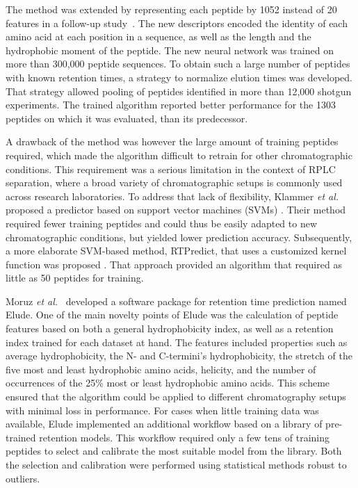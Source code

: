 \documentclass[a4paper]{article}
\begin{document}
The method was extended by representing each peptide by 1052 instead
of 20 features in a follow-up study~\cite{petritis2006improved}. The
new descriptors encoded the identity of each amino acid at each
position in a sequence, as well as the length and the hydrophobic
moment of the peptide. The new neural network was trained on more than
300,000 peptide sequences. To obtain such a large number of peptides
with known retention times, a strategy to normalize elution times was
developed. That strategy allowed pooling of peptides identified in
more than 12,000 shotgun experiments. The trained algorithm reported
better performance for the 1303 peptides on which it was evaluated,
than its predecessor.


A drawback of the method was however the large amount of training
peptides required, which made the algorithm difficult to retrain for
other chromatographic conditions. This requirement was a serious
limitation in the context of RPLC separation, where a broad variety of
chromatographic setups is commonly used across research
laboratories. To address that lack of flexibility, Klammer {\em et
  al.} proposed a predictor based on support vector machines (SVMs)
\cite{klammer2007improving}. Their method required fewer training
peptides and could thus be easily adapted to new chromatographic
conditions, but yielded lower prediction accuracy.  Subsequently, a
more elaborate SVM-based method, {\sc RTPredict}, that uses a
customized kernel function was proposed \cite{rtpredict,
  rtpredictImproved}. That approach provided an algorithm that
required as little as 50 peptides for training.


Moruz {\em et al.}~\cite{elude1} developed a software package for
retention time prediction named {\sc Elude}. One of the main novelty
points of {\sc Elude} was the calculation of peptide features based on
both a general hydrophobicity index, as well as a retention index
trained for each dataset at hand. The features included properties
such as average hydrophobicity, the N- and C-termini's hydrophobicity,
the stretch of the five most and least hydrophobic amino acids,
helicity, and the number of occurrences of the 25\% most or least
hydrophobic amino acids. This scheme ensured that the algorithm could
be applied to different chromatography setups with minimal loss in
performance. For cases when little training data was available, {\sc
  Elude} implemented an additional workflow based on a library of
pre-trained retention models. This workflow required only a few tens
of training peptides to select and calibrate the most suitable model
from the library. Both the selection and calibration were performed
using statistical methods robust to outliers.
\end{document}
